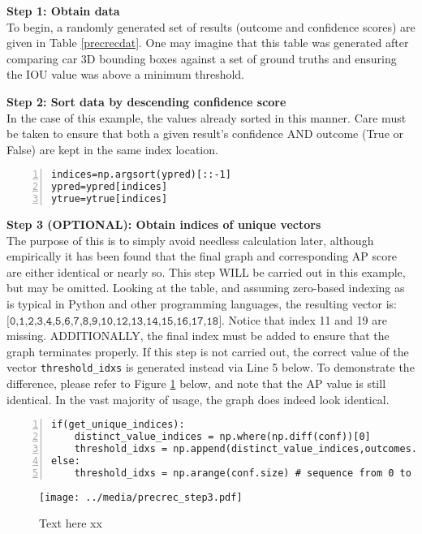 \textbf{{\large Step 1: Obtain data}} \\
To begin, a randomly generated set of results (outcome and confidence scores) are given in Table \ref{precrecdat}. One may imagine that this table was generated after comparing car 3D bounding boxes against a set of ground truths and ensuring the IOU value was above a minimum threshold. 

\textbf{{\large Step 2: Sort data by descending confidence score}} \\
In the case of this example, the values already sorted in this manner. Care must be taken to ensure that both a given result's confidence AND outcome (True or False) are kept in the same index location.
\begin{lstlisting}[numbers=left]
indices=np.argsort(ypred)[::-1]
ypred=ypred[indices]
ytrue=ytrue[indices]
\end{lstlisting}

\textbf{{\large Step 3 (OPTIONAL): Obtain indices of unique vectors}} \\
The purpose of this is to simply avoid needless calculation later, although empirically it has been found that the final graph and corresponding AP score are either identical or nearly so. This step WILL be carried out in this example, but may be omitted. Looking at the table, and assuming zero-based indexing as is typical in Python and other programming languages, the resulting vector is: $\texttt{[0,1,2,3,4,5,6,7,8,9,10,12,13,14,15,16,17,18]}$. Notice that index 11 and 19 are missing. ADDITIONALLY, the final index must be added to ensure that the graph terminates properly. If this step is not carried out, the correct value of the vector \texttt{threshold\_idxs} is generated instead via Line 5 below. To demonstrate the difference, please refer to Figure \ref{precrec_step3} below, and note that the AP value is still identical. In the vast majority of usage, the graph does indeed look identical.
\begin{lstlisting}[numbers=left]
if(get_unique_indices):
    distinct_value_indices = np.where(np.diff(conf))[0]
    threshold_idxs = np.append(distinct_value_indices,outcomes.size-1)
else:
    threshold_idxs = np.arange(conf.size) # sequence from 0 to N-1
\end{lstlisting}

\begin{figure}[h]
    \centering
    \texttt{[image: ../media/precrec\_step3.pdf]}
    \caption{Text here xx}
    \label{precrec_step3}
\end{figure}


